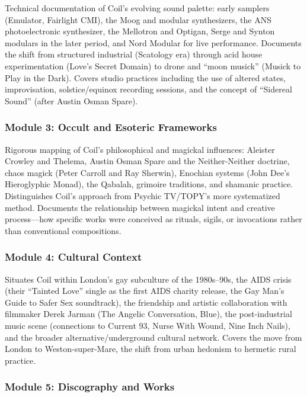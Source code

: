 \documentclass[11pt,letterpaper]{article}
\begin{document}
Technical documentation of Coil's evolving sound palette: early samplers (Emulator, Fairlight CMI), the Moog and modular synthesizers, the ANS photoelectronic synthesizer, the Mellotron and Optigan, Serge and Synton modulars in the later period, and Nord Modular for live performance. Documents the shift from structured industrial (Scatology era) through acid house experimentation (Love's Secret Domain) to drone and ``moon musick'' (Musick to Play in the Dark). Covers studio practices including the use of altered states, improvisation, solstice/equinox recording sessions, and the concept of ``Sidereal Sound'' (after Austin Osman Spare).

\subsubsection{Module 3: Occult and Esoteric Frameworks}

Rigorous mapping of Coil's philosophical and magickal influences: Aleister Crowley and Thelema, Austin Osman Spare and the Neither-Neither doctrine, chaos magick (Peter Carroll and Ray Sherwin), Enochian systems (John Dee's Hieroglyphic Monad), the Qabalah, grimoire traditions, and shamanic practice. Distinguishes Coil's approach from Psychic TV/TOPY's more systematized method. Documents the relationship between magickal intent and creative process---how specific works were conceived as rituals, sigils, or invocations rather than conventional compositions.

\subsubsection{Module 4: Cultural Context}

Situates Coil within London's gay subculture of the 1980s--90s, the AIDS crisis (their ``Tainted Love'' single as the first AIDS charity release, the Gay Man's Guide to Safer Sex soundtrack), the friendship and artistic collaboration with filmmaker Derek Jarman (The Angelic Conversation, Blue), the post-industrial music scene (connections to Current 93, Nurse With Wound, Nine Inch Nails), and the broader alternative/underground cultural network. Covers the move from London to Weston-super-Mare, the shift from urban hedonism to hermetic rural practice.

\subsubsection{Module 5: Discography and Works}
\end{document}
